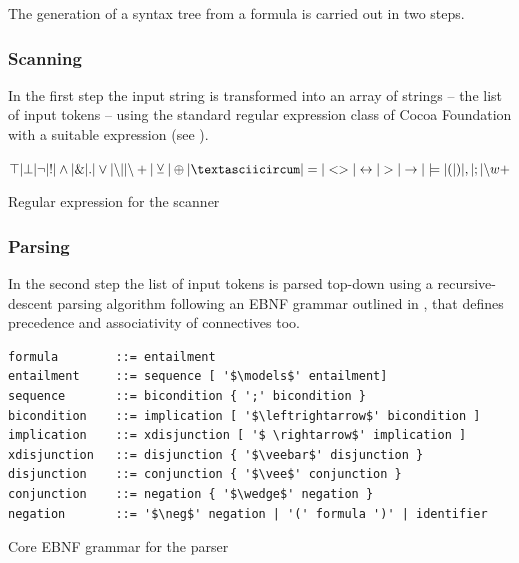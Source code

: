 The generation of a syntax tree from a formula  is carried out in two steps. 

\subsubsection{Scanning}

In the first step the input string is transformed into an array of strings – the list of input tokens –
using the standard regular expression class of Cocoa Foundation with a suitable expression (see ).
\begin{table}[htdp]
\begin{center}
$\top | \bot 
| \neg | !
| \wedge | \& | .
| \vee | {\setminus}| | {\setminus}+ 
| \veebar | \oplus | \textasciicircum
| = | <> | \leftrightarrow 
| > | \rightarrow | \models
| ( | ) | , | ; 
| {\setminus}w+$ 
\caption{Regular expression for the scanner}
\label{tab:REGEX}
\end{center}
\end{table}


\subsubsection{Parsing}

In the second step the list of input tokens is parsed top-down 
using a recursive-descent parsing algorithm \cite[p.144ff]{Louden:1997:CCP:523017} 
following an EBNF grammar outlined in , 
that defines precedence and associativity of connectives too.

\begin{table}[htdp]
\begin{center}
\begin{lstlisting}[mathescape]
formula        ::= entailment
entailment     ::= sequence [ '$\models$' entailment]
sequence       ::= bicondition { ';' bicondition } 
bicondition    ::= implication [ '$\leftrightarrow$' bicondition ]
implication    ::= xdisjunction [ '$ \rightarrow$' implication ]
xdisjunction   ::= disjunction { '$\veebar$' disjunction }
disjunction    ::= conjunction { '$\vee$' conjunction }
conjunction    ::= negation { '$\wedge$' negation }
negation       ::= '$\neg$' negation | '(' formula ')' | identifier
\end{lstlisting}
\caption{Core EBNF grammar for the parser}
\label{tab:CoreEBNF}
\end{center}
\end{table}

